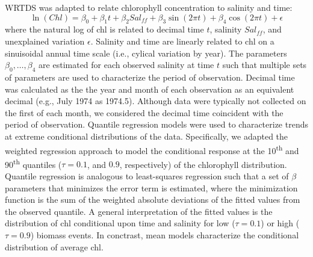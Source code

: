 \documentclass{svjour3}\usepackage[]{graphicx}\usepackage[]{color}
\begin{document}
\ac{WRTDS} was adapted to relate chlorophyll concentration to salinity and time:
\begin{equation}\label{eqn:funform}
\ln\left(Chl\right) = \beta_0 + \beta_1 t + \beta_2 Sal_{ff} + \beta_3 \sin\left(2\pi t\right) + \beta_4 \cos\left(2\pi t\right) + \epsilon
\end{equation}
\noindent where the natural log of \ac{chl} is related to decimal time $t$, salinity $Sal_{ff}$, and unexplained variation $\epsilon$.  Salinity and time are linearly related to \ac{chl} on a sinuisoidal annual time scale (i.e., cylical variation by year). The parameters $\beta_0,\ldots,\beta_4$ are estimated for each observed salinity at time $t$ such that multiple sets of parameters are used to characterize the period of observation.  Decimal time was calculated as the the year and month of each observation as an equivalent decimal (e.g., July 1974 as 1974.5).  Although data were typically not collected on the first of each month, we considered the decimal time coincident with the period of observation.  Quantile regression models \cite{Cade03} were used to characterize trends at extreme conditional distributions of the data.  Specifically, we adapted the weighted regression approach to model the conditional response at the 10\textsuperscript{th} and 90\textsuperscript{th} quantiles ($\tau=0.1$, and $0.9$, respectively) of the chlorophyll distribution. Quantile regression is analogous to least-squares regression such that a set of $\beta$ parameters that minimizes the error term is estimated, where the minimization function is the sum of the weighted absolute deviations of the fitted values from the observed quantile.  A general interpretation of the fitted values is the distribution of \ac{chl} conditional upon time and salinity for low ($\tau=0.1$) or high ($\tau=0.9$) biomass events.  In conctrast, mean models characterize the conditional distribution of average \ac{chl}.
\end{document}
